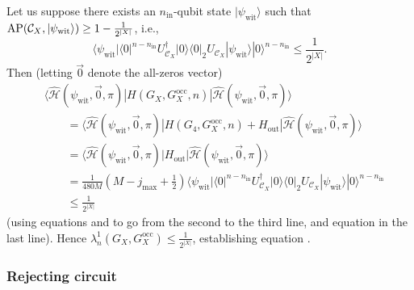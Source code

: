 \documentclass[../thesis-main/thesis-main]{subfiles}
\begin{document}
Let us suppose there exists an $n_{{\text{in}}}$-qubit state $|\psi_{{\text{wit}}}\rangle$ such that $\operatorname{AP}(\mathcal{C}_{X},|\psi_{{\text{wit}}}\rangle)\geq1-\frac{1}{2^{|X|}}$, i.e., 
\begin{equation}
\langle\psi_{{\text{wit}}}|\langle0|^{n-n_{{\text{in}}}}U_{\mathcal{C}_{X}}^{\dagger}|0\rangle\langle0|_{2}U_{\mathcal{C}_{X}}|\psi_{{\text{wit}}}\rangle|0\rangle^{n-n_{{\text{in}}}}\leq\frac{1}{2^{|X|}}.\label{eq:completeness_case}
\end{equation}
Then (letting $\vec{0}$ denote the all-zeros vector) 
\begin{align}
&\langle\widehat{\mathcal{H}}(\psi_{{\text{wit}}},\vec{0},\pi)|H(G_{X},G_X^{\text{occ}},n)|\widehat{\mathcal{H}}(\psi_{{\text{wit}}},\vec{0},\pi)\rangle \nonumber\\
&\qquad = \langle\widehat{\mathcal{H}}(\psi_{{\text{wit}}},\vec{0},\pi)|H(G_{4},G_X^{\text{occ}},n)+H_{{\text{out}}}|\widehat{\mathcal{H}}(\psi_{{\text{wit}}},\vec{0},\pi)\rangle\\
 & \qquad= \langle\widehat{\mathcal{H}}(\psi_{{\text{wit}}},\vec{0},\pi)|H_{{\text{out}}}|\widehat{\mathcal{H}}(\psi_{{\text{wit}}},\vec{0},\pi)\rangle\\
 & \qquad= \frac{1}{480M}(M-j_{\max}+\tfrac{1}{2})\langle\psi_{{\text{wit}}}|\langle0|^{n-n_{{\text{in}}}}U_{\mathcal{C}_{X}}^{\dagger}|0\rangle\langle0|_{2}U_{\mathcal{C}_{X}}|\psi_{{\text{wit}}}\rangle|0\rangle^{n-n_{{\text{in}}}}\\
 & \qquad\leq \frac{1}{2^{|X|}}
\end{align}
(using equations  and  to go from the second to the third line, and equation  in the last line). Hence $\lambda_{n}^{1}(G_{X},G_X^{\text{occ}})\leq\frac{1}{2^{|X|}}$, establishing equation .


\subsubsection{Rejecting circuit}
\end{document}
